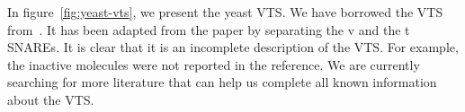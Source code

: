 

In figure~\ref{fig:yeast-vts}, we present the yeast VTS.
%
We have borrowed the VTS from~\cite{burri2004complete}.
%
It has been adapted from the paper by
separating the v and the t SNAREs. 
%
It is clear that it is an incomplete description of the VTS.
%
For example, the inactive molecules were not reported in the reference.
%
We are currently searching for more literature that can help us complete
all known information about the VTS.
%



